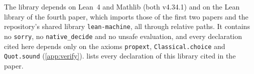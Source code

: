 The library depends on Lean~4 and Mathlib (both v4.34.1) and on the Lean library of the fourth paper, which imports those
of the first two papers and the repository's shared library \texttt{lean-machine}, all through relative paths. It
contains no \texttt{sorry}, no \texttt{native\_decide} and no unsafe evaluation, and every declaration cited here depends
only on the axioms \texttt{propext}, \texttt{Classical.choice} and \texttt{Quot.sound} (\cref{app:verify}).
 lists every declaration of this library cited in the paper.
